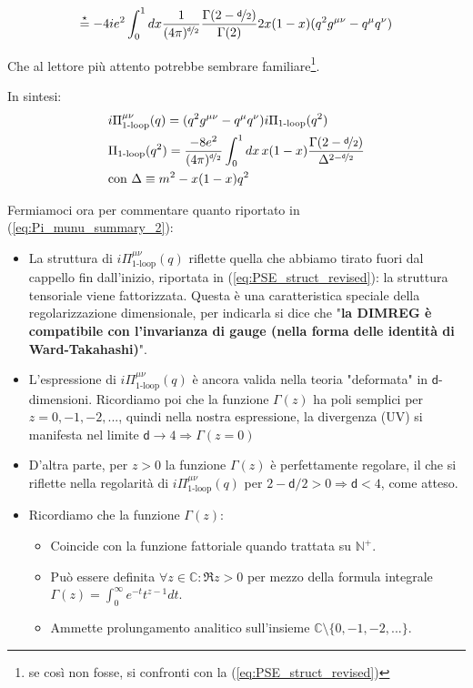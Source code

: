 \documentclass[../main.tex]{subfiles}
\begin{document}
\begin{align*}
    \overset{\star}{=} - 4ie^2\int_0^1dx \frac{1}{(4\pi)^{\nicefrac{\mathsf d}{2}}} \frac{\Gamma(2-\nicefrac{\mathsf d}{2})}{\Gamma(2)} 2x(1-x)(q^2g^{\mu\nu}-q^\mu q^\nu)
\end{align*}

Che al lettore più attento potrebbe sembrare familiare\footnote{se così non fosse, si confronti con la (\ref{eq:PSE_struct_revised})}.


In sintesi:
\begin{equation}
    \begin{aligned}
        &i\Pi^{\mu\nu}_{\text{1-loop}}(q) = (q^2g^{\mu\nu}-q^\mu q^\nu) i \Pi_{\text{1-loop}}(q^2) \\
        &\Pi_{\text{1-loop}}(q^2) = \frac{-8e^2}{ (4\pi)^{\nicefrac{\mathsf d}{2}} } \int_0^1 dx\, x(1-x)\frac{\Gamma(2-\nicefrac{\mathsf d}{2})}{\Delta^{2-\nicefrac{\mathsf d}{2}}} \\
        &\text{con } \Delta \equiv m^2 - x(1-x)q^2
    \end{aligned}
    \label{eq:Pi_munu_summary_2}
\end{equation}

Fermiamoci ora per commentare quanto riportato in (\ref{eq:Pi_munu_summary_2}):
\begin{itemize}
    \item La struttura di $i\Pi^{\mu\nu}_{\text{1-loop}}(q)$ riflette quella che abbiamo tirato fuori dal cappello fin dall'inizio, riportata in (\ref{eq:PSE_struct_revised}): la struttura tensoriale viene fattorizzata.
    Questa è una caratteristica speciale della regolarizzazione dimensionale, per indicarla si dice che "\textbf{la DIMREG è compatibile con l'invarianza di gauge (nella forma delle identità di Ward-Takahashi)}".
    \item L'espressione di $i\Pi^{\mu\nu}_{\text{1-loop}}(q)$ è ancora valida nella teoria "deformata" in $\mathsf d$-dimensioni. Ricordiamo poi che la funzione $\Gamma(z)$ ha poli semplici per $z = 0,-1,-2,...$, quindi nella nostra espressione, la divergenza (UV) si manifesta nel limite $\mathsf d \rightarrow 4 \Rightarrow \Gamma(z=0)$
    \item D'altra parte, per $z>0$ la funzione $\Gamma(z)$ è perfettamente regolare, il che si riflette nella regolarità di $i\Pi^{\mu\nu}_{\text{1-loop}}(q)$ per $2-\mathsf d/2>0 \Rightarrow \mathsf d < 4$, come atteso.
    \item Ricordiamo che la funzione $\Gamma(z)$:
        \begin{itemize}
            \item Coincide con la funzione fattoriale quando trattata su $\mathbb{N}^+$.
            \item Può essere definita $\forall z\in\mathbb{C} : \Re{z}>0$ per mezzo della formula integrale $\Gamma(z)=\int_0^\infty e^{-t}t^{z-1}dt$.
            \item Ammette prolungamento analitico sull'insieme $\mathbb{C}\setminus\{ 0,-1,-2,...\}$.
        \end{itemize}
\end{itemize}
\end{document}
